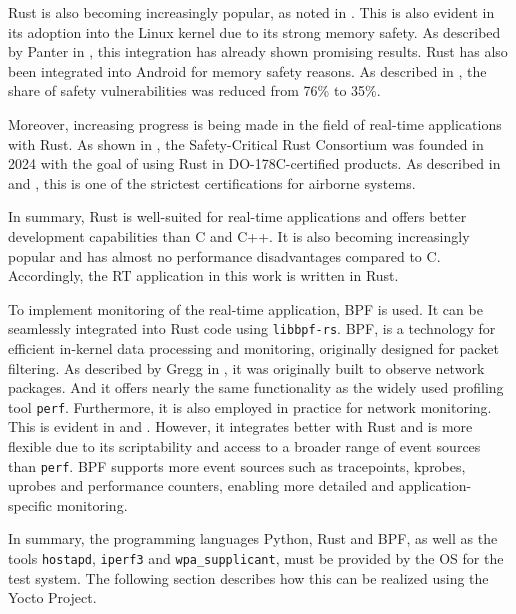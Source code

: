 Rust is also becoming increasingly popular, as noted in \cite[p. 2]{dlr212971}.  
This is also evident in its adoption into the Linux kernel due to its strong memory safety.  
As described by Panter in \cite{10.1145/3674805.3690756}, this integration has already shown promising results.  
Rust has also been integrated into Android for memory safety reasons.  
As described in \cite[p. 1]{seidel2024bringingrustsafetycriticalsystems}, the share of safety vulnerabilities was reduced from 76\% to 35\%.  

Moreover, increasing progress is being made in the field of real-time applications with Rust.  
As shown in \cite{Rust_Foundation}, the Safety-Critical Rust Consortium was founded in 2024 with the goal of using Rust in DO-178C-certified products.  
As described in \cite{do178} and \cite[p. 4]{seidel2024bringingrustsafetycriticalsystems}, this is one of the strictest certifications for airborne systems.  

In summary, Rust is well-suited for real-time applications and offers better development capabilities than C and C++.  
It is also becoming increasingly popular and has almost no performance disadvantages compared to C.  
Accordingly, the RT application in this work is written in Rust.  

To implement monitoring of the real-time application, \ac{BPF} is used.  
It can be seamlessly integrated into Rust code using \texttt{libbpf-rs}.  
\ac{BPF}, is a technology for efficient in-kernel data processing and monitoring, originally designed for packet filtering.  
As described by Gregg in \cite[Chap. 2.10]{Gregg_2020}, it was originally built to observe network packages.
And it offers nearly the same functionality as the widely used profiling tool \texttt{perf}.  
Furthermore, it is also employed in practice for network monitoring.
This is evident in \cite{network_obser} and \cite{9359159}.
However, it integrates better with Rust and is more flexible due to its scriptability and access to a broader range of event sources than \texttt{perf}.  
BPF supports more event sources such as tracepoints, \acp{kprobe}, \acp{uprobe} and performance counters, enabling more detailed and application-specific monitoring.  

In summary, the programming languages Python, Rust and BPF, as well as the tools \texttt{hostapd}, \texttt{iperf3} and \texttt{wpa\_supplicant}, must be provided by the \ac{OS} for the test system.  
The following section describes how this can be realized using the Yocto Project.

